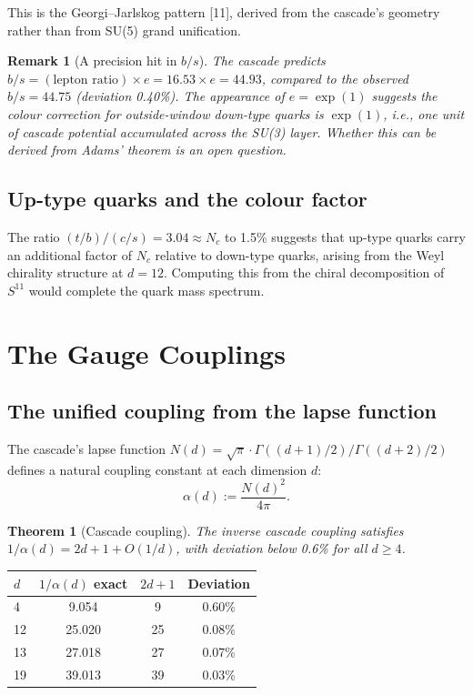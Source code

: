 \documentclass[12pt,a4paper]{article}
\newtheorem{theorem}{Theorem}[section]
\newtheorem*{remark}{Remark}
\begin{document}
This is the Georgi--Jarlskog pattern [11], derived from the cascade's geometry rather than from SU(5) grand unification.

\begin{remark}[A precision hit in $b/s$]
The cascade predicts $b/s = (\text{lepton ratio}) \times e = 16.53 \times e = 44.93$, compared to the observed $b/s = 44.75$ (deviation 0.40\%). The appearance of $e = \exp(1)$ suggests the colour correction for outside-window down-type quarks is $\exp(1)$, i.e., one unit of cascade potential accumulated across the SU(3) layer. Whether this can be derived from Adams' theorem is an open question.
\end{remark}

\subsection{Up-type quarks and the colour factor}

The ratio $(t/b)/(c/s) = 3.04 \approx N_c$ to 1.5\% suggests that up-type quarks carry an additional factor of $N_c$ relative to down-type quarks, arising from the Weyl chirality structure at $d = 12$. Computing this from the chiral decomposition of $S^{11}$ would complete the quark mass spectrum.

\section{The Gauge Couplings}

\subsection{The unified coupling from the lapse function}

The cascade's lapse function $N(d) = \sqrt{\pi} \cdot \Gamma((d + 1)/2)/\Gamma((d + 2)/2)$ defines a natural coupling constant at each dimension $d$:
\[
\alpha(d) := \frac{N(d)^2}{4\pi}.
\]

\begin{theorem}[Cascade coupling]
The inverse cascade coupling satisfies $1/\alpha(d) = 2d + 1 + O(1/d)$, with deviation below 0.6\% for all $d \geq 4$.
\end{theorem}

\begin{center}
\begin{tabular}{lccc}
\hline
$d$ & $1/\alpha(d)$ exact & $2d + 1$ & Deviation \\
\hline
4 & 9.054 & 9 & 0.60\% \\
12 & 25.020 & 25 & 0.08\% \\
13 & 27.018 & 27 & 0.07\% \\
19 & 39.013 & 39 & 0.03\% \\
\hline
\end{tabular}
\end{center}
\end{document}

